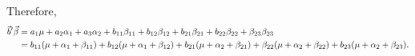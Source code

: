 Therefore,
\begin{align*}
    \vec{b}'\vec{\beta}
     & =a_1\mu+a_2\alpha_1+a_3\alpha_2+b_{11}\beta_{11}+b_{12}\beta_{12}+b_{21}\beta_{21}
    +b_{22}\beta_{22}+\beta_{23}\beta_{23}                                                                                                                                   \\
     & =b_{11}(\mu+\alpha_1+\beta_{11})+b_{12}(\mu+\alpha_1+\beta_{12})+b_{21}(\mu+\alpha_2+\beta_{21})+\beta_{22}(\mu+\alpha_2+\beta_{22})+b_{23}(\mu+\alpha_2+\beta_{23}).
\end{align*}